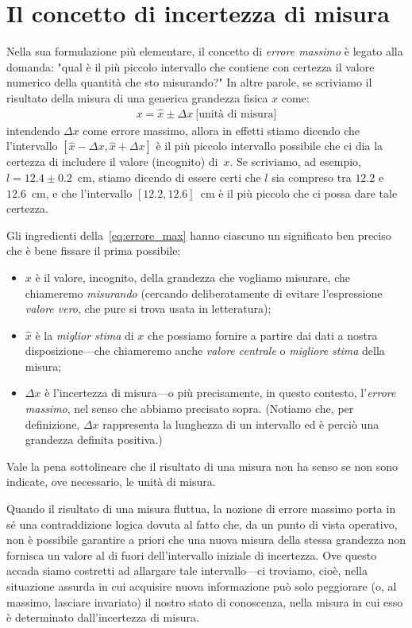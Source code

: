 \section{Il concetto di incertezza di misura}
\label{sec:errore_max}

Nella sua formulazione più elementare, il concetto di \emph{errore massimo}
è legato alla domanda: "qual è il più piccolo intervallo che contiene
con certezza il valore numerico della quantità che sto misurando?"
In altre parole, se scriviamo il risultato della misura di una generica
grandezza fisica $x$ come:
\begin{align}\label{eq:errore_max}
  x = \hat{x} \pm \Delta x~\text{[unità di misura]}
\end{align}
intendendo $\Delta x$ come errore massimo, allora in effetti stiamo dicendo che
l'intervallo $[\hat{x} - \Delta x, \hat{x} + \Delta x]$ è il più piccolo
intervallo possibile che ci dia la certezza di includere il valore (incognito)
di~$x$. Se scriviamo, ad esempio, $l = 12.4 \pm 0.2$~cm, stiamo dicendo di
essere certi che $l$ sia compreso tra $12.2$ e~$12.6$~cm, e che l'intervallo
$[12.2, 12.6]$~cm è il più piccolo che ci possa dare tale certezza.

Gli ingredienti della~\eqref{eq:errore_max} hanno ciascuno un significato ben
preciso che è bene fissare il prima possibile:
\begin{itemize}
\item $x$ è il valore, incognito, della grandezza che vogliamo misurare, che
  chiameremo \emph{misurando} (cercando deliberatamente di evitare l'espressione
  \emph{valore vero}, che pure si trova usata in letteratura);
\item $\hat{x}$ è la \emph{miglior stima} di $x$ che possiamo fornire a
  partire dai dati a nostra disposizione---che chiameremo anche
  \emph{valore centrale} o \emph{migliore stima} della misura;
\item $\Delta x$ è l'incertezza di misura---o più precisamente, in questo
  contesto, l'\emph{errore massimo}, nel senso che abbiamo
  precisato sopra. (Notiamo che, per definizione, $\Delta x$ rappresenta la
  lunghezza di un intervallo ed è perciò una grandezza definita positiva.)
\end{itemize}
Vale la pena sottolineare che il risultato di una misura non ha senso se non
sono indicate, ove necessario, le unità di misura.

Quando il risultato di una misura fluttua, la nozione di errore massimo porta
in sé una contraddizione logica dovuta al fatto che, da un punto di vista
operativo, non è possibile garantire a priori che una nuova misura della
stessa grandezza non fornisca un valore al di fuori dell'intervallo iniziale di
incertezza. Ove questo accada siamo costretti ad allargare tale intervallo---ci
troviamo, cioè, nella situazione assurda in cui acquisire nuova informazione
può solo peggiorare (o, al massimo, lasciare invariato) il nostro stato di
conoscenza, nella misura in cui esso è determinato dall'incertezza di misura.

